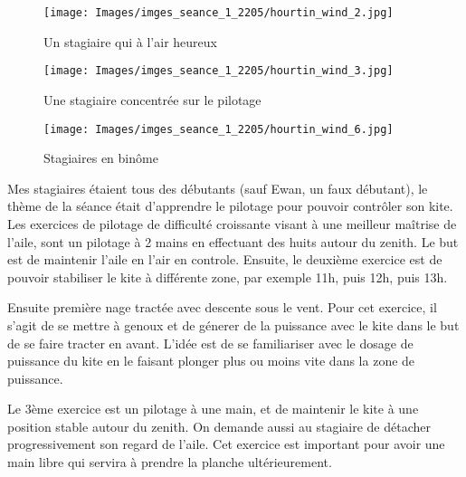 \documentclass[11pt,a4paper]{report}
\begin{document}
\begin{figure}
\begin{minipage}{0.4\textwidth}
\texttt{[image: Images/imges\_seance\_1\_2205/hourtin\_wind\_2.jpg]} 
\caption{Un stagiaire qui à l'air heureux}
\end{minipage}
\hfill
\begin{minipage}{0.4\textwidth}
\texttt{[image: Images/imges\_seance\_1\_2205/hourtin\_wind\_3.jpg]} 
\caption{Une stagiaire concentrée sur le pilotage}
\end{minipage}
\end{figure}

\begin{figure}
\texttt{[image: Images/imges\_seance\_1\_2205/hourtin\_wind\_6.jpg]}
\caption{Stagiaires en bin\^ome} 
\end{figure}

Mes stagiaires étaient tous des débutants (sauf Ewan, un faux débutant), 
le thème de la séance était d'apprendre le pilotage pour pouvoir contrôler son kite.
Les exercices de pilotage de difficulté croissante visant à une
meilleur maîtrise de l'aile, sont un pilotage à 2 mains en effectuant des huits
autour du zenith. Le but est de maintenir l'aile en l'air en controle.
Ensuite, le deuxième exercice est de pouvoir stabiliser le kite à différente 
zone, par exemple 11h, puis 12h, puis 13h.

Ensuite première nage tractée avec descente sous 
le vent. Pour cet exercice, il s'agit de se mettre à genoux
et de génerer de la puissance avec le kite dans le but
de se faire tracter en avant.  L'idée est de se familiariser
avec le dosage de puissance du kite en le faisant plonger
plus ou moins vite dans la zone de puissance.

Le 3ème exercice est un pilotage à une main, et 
de maintenir le kite à une position stable autour
du zenith. On demande aussi au stagiaire de
détacher progressivement son regard de l'aile.
Cet exercice est important pour avoir une main libre
qui servira à prendre la planche ultérieurement.
\end{document}
